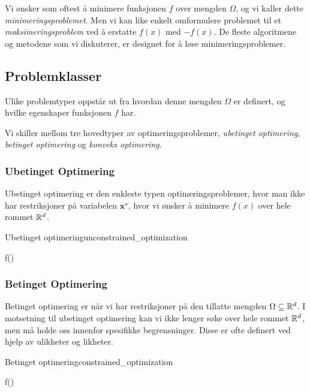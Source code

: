 Vi ønsker som oftest å minimere funksjonen \(f\) over mengden \(\Omega\), og vi kaller dette \emph{minimeringsproblemet}.
Men vi kan like enkelt omformulere problemet til et \emph{maksimeringsproblem} ved å erstatte \(f(x)\) med \(-f(x)\).
De fleste algoritmene og metodene som vi diskuterer, er designet for å løse minimeringsproblemer.

\subsection{Problemklasser}
\label{sec:problem_classes}
Ulike problemtyper oppstår ut fra hvordan denne mengden \(\Omega\) er definert, og hvilke egenskaper funksjonen \(f\) har.

Vi skiller mellom tre hovedtyper av optimeringsproblemer, \emph{ubetinget optimering}, \emph{betinget optimering} og \emph{konveks optimering}.

\subsubsection{Ubetinget Optimering}
Ubetinget optimering er den enkleste typen optimeringsproblemer, hvor man ikke har restriksjoner på variabelen \(\symbf{x}^\star\), hvor vi ønsker å minimere \(f(x)\) over hele rommet \(\mathbb{R}^d\).
\begin{definition}{Ubetinget optimering}{unconstrained_optimization}
\begin{mini!}{}{f()}{}{}
\label{eq:unconstrained_optimization}
\end{mini!}
\end{definition}

\subsubsection{Betinget Optimering}
Betinget optimering er når vi har restriksjoner på den tillatte mengden \(\Omega \subseteq \mathbb{R}^d\). I motsetning til ubetinget optimering kan vi ikke lenger søke over hele rommet \(\mathbb{R}^d\), men må holde oss innenfor spesifikke begrensninger.
Disse er ofte definert ved hjelp av ulikheter og likheter.
\begin{definition}{Betinget optimering}{constrained_optimization}
\begin{mini!}{}{f()}{}{}
\label{eq:constrained_optimization}
\end{mini!}
\end{definition}


